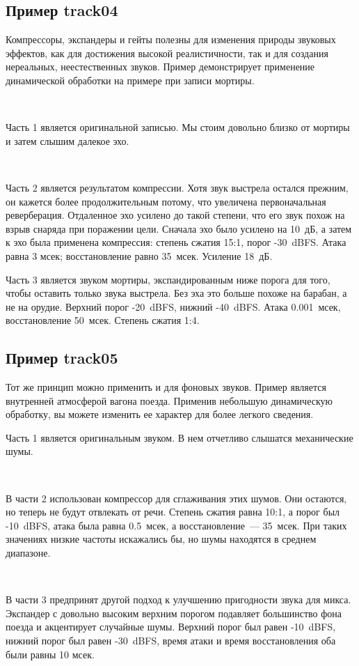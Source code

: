 \documentclass{beamer}
\begin{document}
\subsection{Пример track04}
\begin{frame}
Компрессоры, экспандеры и гейты полезны для изменения природы звуковых эффектов, как для достижения высокой реалистичности, так и для создания нереальных, неестественных звуков. Пример демонстрирует применение динамической обработки на примере при записи мортиры.

~

Часть 1 является оригинальной записью. Мы стоим довольно близко от мортиры и затем слышим далекое эхо.

~

Часть 2 является результатом компрессии. Хотя звук выстрела остался прежним, он кажется более продолжительным потому, что увеличена первоначальная реверберация. Отдаленное эхо усилено до такой степени, что его звук похож на взрыв снаряда при поражении цели. Сначала эхо было усилено на 10~дБ, а затем к эхо была применена компрессия: степень сжатия 15:1, порог -30~dBFS. Атака равна 3 мсек; восстановление равно 35~мсек. Усиление 18~дБ.

\end{frame}
\begin{frame}
Часть 3 является звуком мортиры, экспандированным ниже порога для того, чтобы оставить только звука выстрела. Без эха это больше похоже на барабан, а не на орудие. Верхний порог -20~dBFS, нижний -40~dBFS. Атака 0.001~мсек, восстановление 50~мсек. Степень сжатия 1:4.
\end{frame}

\subsection{Пример track05}
\begin{frame}
Тот же принцип можно применить и для фоновых звуков. Пример является внутренней атмосферой вагона поезда. Применив небольшую динамическую обработку, вы можете изменить ее характер для более легкого сведения.

Часть 1 является оригинальным звуком. В нем отчетливо слышатся механические шумы.

~

В части 2 использован компрессор для сглаживания этих шумов. Они остаются, но теперь не будут отвлекать от речи. Степень сжатия равна 10:1, а порог был -10~dBFS, атака была равна 0.5~мсек, а восстановление~--- 35~мсек. При таких значениях низкие частоты искажались бы, но шумы находятся в среднем диапазоне.

~

В части 3 предпринят другой подход к улучшению пригодности звука для микса. Экспандер с довольно высоким верхним порогом подавляет большинство фона поезда и акцентирует случайные шумы. Верхний порог был равен -10~dBFS, нижний порог был равен -30~dBFS, время атаки и время восстановления оба были равны 10 мсек.
\end{frame}
\end{document}
